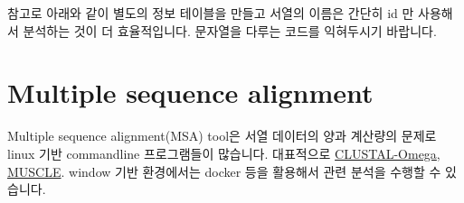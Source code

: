 \documentclass[
]{book}
\newenvironment{Shaded}{\begin{snugshade}}{\end{snugshade}}
\newcommand{\AttributeTok}[1]{\textcolor[rgb]{0.77,0.63,0.00}{#1}}
\newcommand{\ControlFlowTok}[1]{\textcolor[rgb]{0.13,0.29,0.53}{\textbf{#1}}}
\newcommand{\DecValTok}[1]{\textcolor[rgb]{0.00,0.00,0.81}{#1}}
\newcommand{\FunctionTok}[1]{\textcolor[rgb]{0.00,0.00,0.00}{#1}}
\newcommand{\NormalTok}[1]{#1}
\newcommand{\OtherTok}[1]{\textcolor[rgb]{0.56,0.35,0.01}{#1}}
\newcommand{\SpecialCharTok}[1]{\textcolor[rgb]{0.00,0.00,0.00}{#1}}
\newcommand{\StringTok}[1]{\textcolor[rgb]{0.31,0.60,0.02}{#1}}
\begin{document}
참고로 아래와 같이 별도의 정보 테이블을 만들고 서열의 이름은 간단히 id 만 사용해서 분석하는 것이 더 효율적입니다. 문자열을 다루는 코드를 익혀두시기 바랍니다.

\begin{Shaded}
\end{Shaded}

\hypertarget{multiple-sequence-alignment}{%
\section{Multiple sequence alignment}\label{multiple-sequence-alignment}}

Multiple sequence alignment(MSA) tool은 서열 데이터의 양과 계산량의 문제로 linux 기반 commandline 프로그램들이 많습니다. 대표적으로 \href{https://www.ebi.ac.uk/Tools/msa/clustalo/}{CLUSTAL-Omega}, \href{https://www.ebi.ac.uk/Tools/msa/muscle/}{MUSCLE}. window 기반 환경에서는 docker 등을 활용해서 관련 분석을 수행할 수 있습니다.
\end{document}
